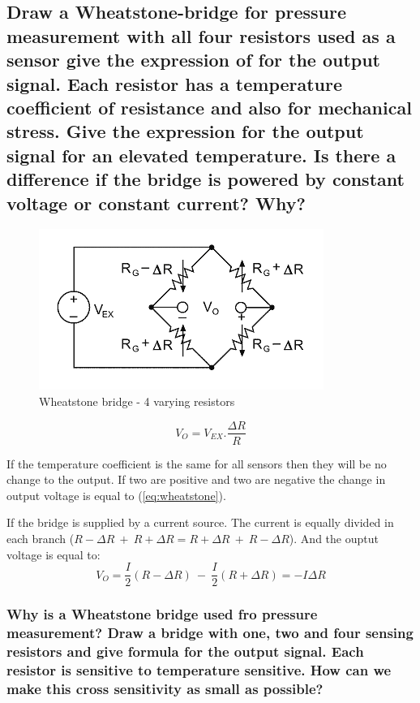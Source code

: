 \documentclass[10pt,a4paper]{article}
\begin{document}
\subsection{Draw a Wheatstone-bridge for pressure measurement with all four resistors used as a sensor give the expression of for the output signal. Each resistor has a temperature coefficient of resistance and also for mechanical stress. Give the expression for the output signal for an elevated temperature. Is there a difference if the bridge is powered by constant voltage or constant current? Why?}

\begin{figure}[h!]
    \centering
    \includegraphics{bridge.png}
    \caption{Wheatstone bridge - 4 varying resistors}
\end{figure}

\begin{equation} \label{eq:wheatstone}
	V_{O} = V_{EX}.\frac{\Delta R}{R}
\end{equation}

If the temperature coefficient is the same for all sensors then they will be no change to the output. If two are positive and two are negative the change in output voltage is equal to (\ref{eq:wheatstone}).

If the bridge is supplied by a current source. The current is equally divided in each branch ($R-\Delta R ~ + ~ R+\Delta R = R+\Delta R ~ + ~ R-\Delta R$). And the ouptut voltage is equal to:
\[ V_O = \frac{I}{2}(R-\Delta R) ~-~ \frac{I}{2}(R+\Delta R) = -I\Delta R \]

\subsubsection{Why is a Wheatstone bridge used fro pressure measurement? Draw a bridge with one, two and four sensing resistors and give formula for the output signal. Each resistor is sensitive to temperature sensitive. How can we make this cross sensitivity as small as possible?}
\end{document}
